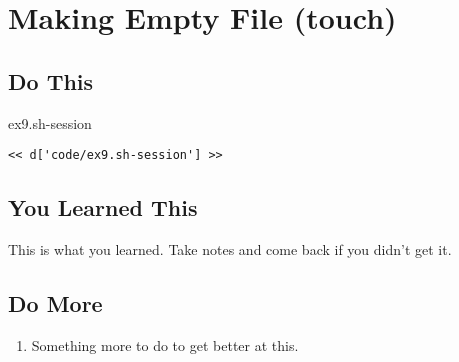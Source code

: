 \chapter{Making Empty File (touch)}

\section{Do This}

\begin{code}{ex9.sh-session}
\begin{Verbatim}
<< d['code/ex9.sh-session'] >>
\end{Verbatim}
\end{code}


\section{You Learned This}

This is what you learned.  Take notes and come back if you didn't get it.

\section{Do More}

\begin{enumerate}
\item Something more to do to get better at this.
\end{enumerate}

